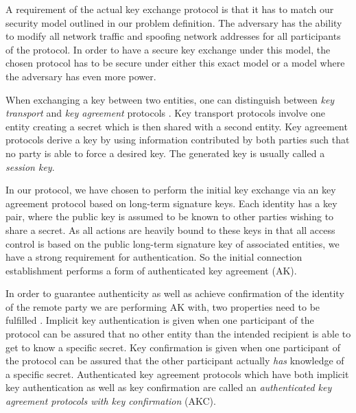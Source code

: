 A requirement of the actual key exchange protocol is that it has to match our security model outlined in our problem definition.
The adversary has the ability to modify all network traffic and spoofing network addresses for all participants of the protocol.
In order to have a secure key exchange under this model, the chosen protocol has to be secure under either this exact model or a model where the adversary has even more power.

When exchanging a key between two entities, one can distinguish between \emph{key transport} and \emph{key agreement} protocols \cite{menezes1996handbook}.
Key transport protocols involve one entity creating a secret which is then shared with a second entity.
Key agreement protocols derive a key by using information contributed by both parties such that no party is able to force a desired key.
The generated key is usually called a \emph{session key}.

In our protocol, we have chosen to perform the initial key exchange via an key agreement protocol based on long-term signature keys.
Each identity has a key pair, where the public key is assumed to be known to other parties wishing to share a secret.
As all actions are heavily bound to these keys in that all access control is based on the public long-term signature key of associated entities, we have a strong requirement for authentication.
So the initial connection establishment performs a form of authenticated key agreement (AK).

In order to guarantee authenticity as well as achieve confirmation of the identity of the remote party we are performing AK with, two properties need to be fulfilled \cite{law2003efficient}.
Implicit key authentication is given when one participant of the protocol can be assured that no other entity than the intended recipient is able to get to know a specific secret.
Key confirmation is given when one participant of the protocol can be assured that the other participant actually \emph{has} knowledge of a specific secret.
Authenticated key agreement protocols which have both implicit key authentication as well as key confirmation are called an \emph{authenticated key agreement protocols with key confirmation} (AKC).

